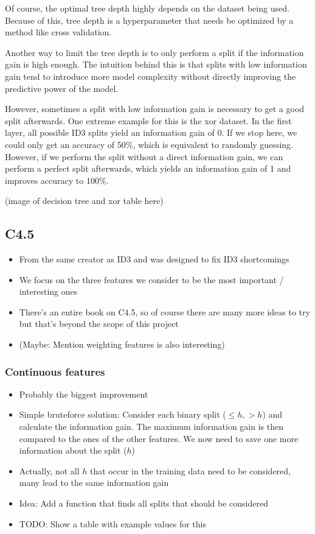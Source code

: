 \documentclass[a4paper]{article}
\begin{document}
Of course, the optimal tree depth highly depends on the dataset being used. Because of this, tree depth is a hyperparameter that needs be optimized by a method like cross validation.

Another way to limit the tree depth is to only perform a split if the information gain is high enough. The intuition behind this is that splits with low information gain tend to introduce more model complexity without directly improving the predictive power of the model.

However, sometimes a split with low information gain is necessary to get a good split afterwards. One extreme example for this is the xor dataset. In the first layer, all possible ID3 splits yield an information gain of 0. If we stop here, we could only get an accuracy of 50\%, which is equivalent to randomly guessing. However, if we perform the split without a direct information gain, we can perform a perfect split afterwards, which yields an information gain of 1 and improves accuracy to 100\%.

(image of decision tree and xor table here)

\subsection{C4.5}

\begin{itemize}
	\item From the same creator as ID3 and was designed to fix ID3 shortcomings
    \item We focus on the three features we consider to be the most important / interesting ones
    \item There's an entire book on C4.5, so of course there are many more ideas to try but that's beyond the scope of this project
    \item (Maybe: Mention weighting features is also interesting)
\end{itemize}

\subsubsection{Continuous features}

\begin{itemize}
	\item Probably the biggest improvement
    \item Simple bruteforce solution: Consider each binary split ($\le h, > h$) and calculate the information gain. The maximum information gain is then compared to the ones of the other features. We now need to save one more information about the split ($h$)
    \item Actually, not all $h$ that occur in the training data need to be considered, many lead to the same information gain
    \item Idea: Add a function that finds all splits that should be considered
    \item TODO: Show a table with example values for this
\end{itemize}
\end{document}
